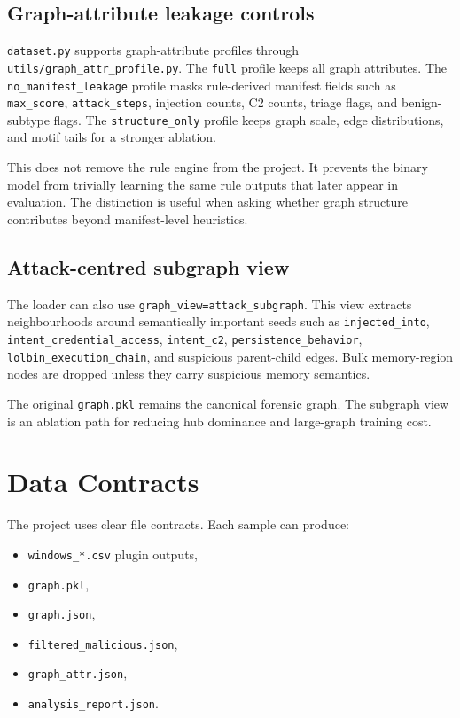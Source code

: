 \subsection{Graph-attribute leakage controls}

\texttt{dataset.py} supports graph-attribute profiles through \texttt{utils/graph\_attr\_profile.py}. The \texttt{full} profile keeps all graph attributes. The \texttt{no\_manifest\_leakage} profile masks rule-derived manifest fields such as \texttt{max\_score}, \texttt{attack\_steps}, injection counts, C2 counts, triage flags, and benign-subtype flags. The \texttt{structure\_only} profile keeps graph scale, edge distributions, and motif tails for a stronger ablation.

This does not remove the rule engine from the project. It prevents the binary model from trivially learning the same rule outputs that later appear in evaluation. The distinction is useful when asking whether graph structure contributes beyond manifest-level heuristics.

\subsection{Attack-centred subgraph view}

The loader can also use \texttt{graph\_view=attack\_subgraph}. This view extracts neighbourhoods around semantically important seeds such as \texttt{injected\_into}, \texttt{intent\_credential\_access}, \texttt{intent\_c2}, \texttt{persistence\_behavior}, \texttt{lolbin\_execution\_chain}, and suspicious parent-child edges. Bulk memory-region nodes are dropped unless they carry suspicious memory semantics.

The original \texttt{graph.pkl} remains the canonical forensic graph. The subgraph view is an ablation path for reducing hub dominance and large-graph training cost.

\section{Data Contracts}

The project uses clear file contracts. Each sample can produce:

\begin{itemize}
\item \texttt{windows\_*.csv} plugin outputs,
\item \texttt{graph.pkl},
\item \texttt{graph.json},
\item \texttt{filtered\_malicious.json},
\item \texttt{graph\_attr.json},
\item \texttt{analysis\_report.json}.
\end{itemize}


